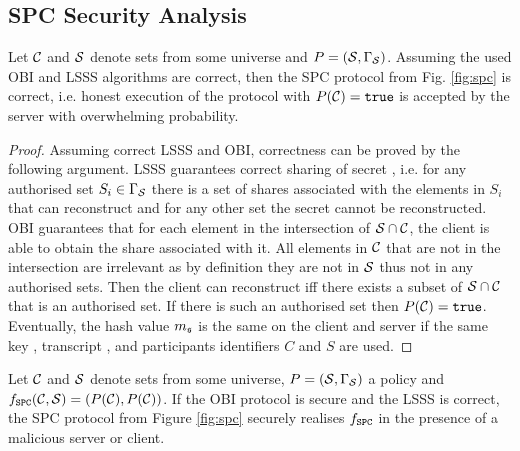 \subsection{SPC Security Analysis}
\begin{lemma}[Correctness]\label{lem:correct}
  Let $\mathcal{C}$ and $\mathcal{S}$ denote sets from some universe and $P=(\mathcal{S},\Gamma_\mathcal{S})$.
  Assuming the used OBI and LSSS algorithms are correct, then the SPC protocol from Fig. \ref{fig:spc} is correct, i.e. honest execution of the protocol with $P(\mathcal{C}) = \mathtt{true}$ is accepted by the server with overwhelming probability.\end{lemma}
\begin{proof}
Assuming correct LSSS and OBI, correctness can be proved by the following argument.
LSSS guarantees correct sharing of secret \secret, i.e. for any authorised set $S_i\in \Gamma_\mathcal{S}$ there is a set of shares associated with the elements in $S_i$ that can reconstruct \secret and for any other set the secret cannot be reconstructed. 
OBI guarantees that for each element in the intersection of $\mathcal{S}\cap \mathcal{C}$, the client is able to obtain the share associated with it. 
All elements in $\mathcal{C}$ that are not in the intersection are irrelevant as by definition they are not in $\mathcal{S}$ thus not in any authorised sets. Then the client can reconstruct \secret iff there exists a subset of $\mathcal{S}\cap \mathcal{C}$ that is an authorised set. 
If there is such an authorised set then $P(\mathcal{C})=\mathtt{true}$. Eventually, the hash value $m_\mathfrak{s}$ is the same on the client and server if the same key \secret, transcript \trans, and participants identifiers $C$ and $S$ are used.

\end{proof}

\begin{lemma}[Privacy]\label{lem:SPCprivacy}
 Let $\mathcal{C}$ and $\mathcal{S}$ denote sets from some universe, $P=(\mathcal{S},\Gamma_\mathcal{S})$ a policy and $f_\mathtt{SPC}(\mathcal{C}, \mathcal{S})=(P(\mathcal{C}), P(\mathcal{C}))$. If the OBI protocol is secure and the LSSS is correct, the SPC protocol from Figure \ref{fig:spc} securely realises $f_\mathtt{SPC}$ in the presence of a malicious server or client.
\end{lemma}

